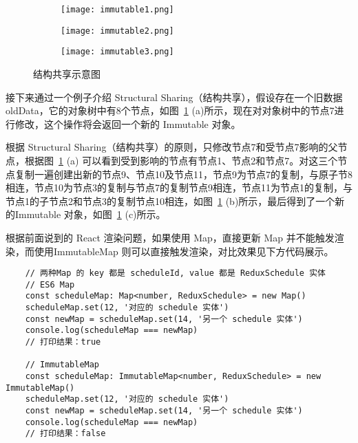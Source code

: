 \begin{figure}[!htp]
    \centering
    \begin{subfigure}{0.4\textwidth}
      \centering
      \texttt{[image: immutable1.png]}
      \caption{}
    \end{subfigure}
    \hspace{1cm}
    \begin{subfigure}{0.4\textwidth}
      \centering
      \texttt{[image: immutable2.png]}
      \caption{}
    \end{subfigure}
    \begin{subfigure}{0.4\textwidth}
      \centering
      \texttt{[image: immutable3.png]}
      \caption{}
    \end{subfigure}
    \caption{结构共享示意图}
    \label{fig:immutable}
  \end{figure}

  接下来通过一个例子介绍 Structural Sharing（结构共享），假设存在一个旧数据 oldData，它的对象树中有8个节点，如图~\ref{fig:immutable} (a)所示，现在对对象树中的节点7进行修改，这个操作将会返回一个新的 Immutable 对象。

   根据 Structural Sharing（结构共享）的原则，只修改节点7和受节点7影响的父节点，根据图~\ref{fig:immutable} (a) 可以看到受到影响的节点有节点1、节点2和节点7。对这三个节点复制一遍创建出新的节点9、节点10及节点11，节点9为节点7的复制，与原子节8相连，节点10为节点3的复制与节点7的复制节点9相连，节点11为节点1的复制，与节点1的子节点2和节点3的复制节点10相连，如图~\ref{fig:immutable} (b)所示，最后得到了一个新的Immutable 对象，如图~\ref{fig:immutable} (c)所示。

  根据前面说到的 React 渲染问题，如果使用 Map，直接更新 Map 并不能触发渲染，而使用ImmutableMap 则可以直接触发渲染，对比效果见下方代码展示。

  {\setmainfont{Courier New Bold}
  \begin{lstlisting}
    // 两种Map 的 key 都是 scheduleId, value 都是 ReduxSchedule 实体
    // ES6 Map
    const scheduleMap: Map<number, ReduxSchedule> = new Map()
    scheduleMap.set(12, '对应的 schedule 实体')
    const newMap = scheduleMap.set(14, '另一个 schedule 实体')
    console.log(scheduleMap === newMap)
    // 打印结果：true

    // ImmutableMap
    const scheduleMap: ImmutableMap<number, ReduxSchedule> = new ImmutableMap()
    scheduleMap.set(12, '对应的 schedule 实体')
    const newMap = scheduleMap.set(14, '另一个 schedule 实体')
    console.log(scheduleMap === newMap)
    // 打印结果：false
   \end{lstlisting}}

